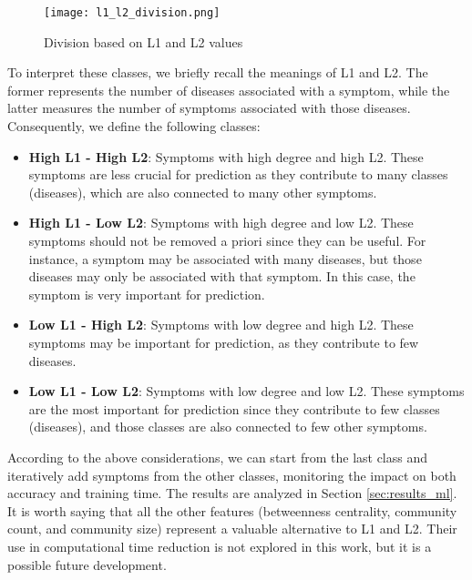 \begin{figure}[H]
    \centering
    \texttt{[image: l1\_l2\_division.png]}
    \caption{Division based on L1 and L2 values}
    \label{fig:l1_l2_division}
\end{figure}
\noindent
To interpret these classes, we briefly recall the meanings of L1 and L2. The former represents the number of diseases
associated with a symptom, while the latter measures the number of symptoms associated with those diseases.
Consequently, we define the following classes:\\

\begin{itemize}
    \setlength\itemsep{1em}
    \item \textbf{High L1 - High L2}: Symptoms with high degree and high L2. These symptoms are less crucial for
          prediction as they contribute to many classes (diseases), which are also connected to many other symptoms.
    \item \textbf{High L1 - Low L2}: Symptoms with high degree and low L2. These symptoms should not be removed a
          priori since they can be useful. For instance, a symptom may be associated with many diseases, but those
          diseases may only be associated with that symptom. In this case, the symptom is very important for prediction.
    \item \textbf{Low L1 - High L2}: Symptoms with low degree and high L2. These symptoms may be important for
          prediction, as they contribute to few diseases.
    \item \textbf{Low L1 - Low L2}: Symptoms with low degree and low L2. These symptoms are the most important
          for prediction since they contribute to few classes (diseases), and those classes are also connected to
          few other symptoms.
\end{itemize}
\noindent
According to the above considerations, we can start from the last class and iteratively add symptoms from the
other classes, monitoring the impact on both accuracy and training time.
The results are analyzed in Section \ref{sec:results_ml}.\\
It is worth saying that all the other features (betweenness centrality, community count, and community size)
represent a valuable alternative to L1 and L2. Their use in computational time reduction is not explored in this work,
but it is a possible future development.




